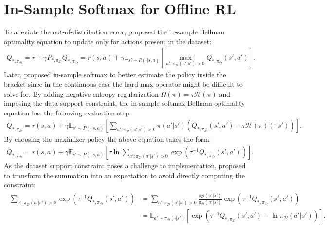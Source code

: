 \documentclass{article}
\newcommand{\AdaBracket}[1]{\left(#1\right)}
\newcommand{\AdaRectBracket}[1]{\left[#1\right]}
\newcommand{\expectation}[2]{\mathbb{E}_{#1}\AdaRectBracket{#2}}
\newcommand{\entropy}{\mathcal{H}\left( \pi \right)}
\newcommand{\datasetOptimalQ}{Q_{*, \pi_{\mathcal{D}}}}
\newcommand{\datasetPolicy}{\pi_{\mathcal{D}}}
\begin{document}
\section{In-Sample Softmax for Offline RL}


To alleviate the out-of-distribution error, \citet{Fujimoto2019-InSampleMax} proposed the in-sample Bellman optimality equation to update only for actions present in the dataset:
\begin{align}
    \datasetOptimalQ = r + \gamma P_{*, \datasetPolicy} \datasetOptimalQ = r(s,a) + \gamma \expectation{s'\sim P(\cdot | s,a)}{\max_{a': \datasetPolicy(a'|s') > 0} \datasetOptimalQ(s',a')}.
    \label{eq:hardmax_offline}
\end{align}
Later, \citet{Xiao2023-InSampleSoftmax} proposed in-sample softmax to better estimate the policy inside the bracket since in the continuous case the hard max operator might be difficult to solve for.
By adding negative entropy regularization $\Omega(\pi) = \tau \entropy$ and imposing the data support constraint, the in-sample softmax Bellman optimality equation has the following evaluation step:
\begin{align}
    \datasetOptimalQ = r(s,a) +  \gamma \expectation{s'\sim P(\cdot | s,a)}{ \sum_{a': \datasetPolicy(a'|s') > 0} \!\!\!\!\! \pi(a'|s') \AdaBracket{\datasetOptimalQ(s',a') - \tau\entropy(\cdot|s')}}.
    \label{eq:insample_softmax}
\end{align}
By choosing the maximizer policy the above equation takes the form:
\begin{align}
    \datasetOptimalQ = r(s,a) +  \gamma \expectation{s'\sim P(\cdot | s,a)}{\tau \ln \!\!\!\!\!\sum_{a': \datasetPolicy(a'|s') > 0} \!\!\!\!\! \exp\AdaBracket{\tau^{-1} \datasetOptimalQ(s',a')}}.
\end{align}
As the dataset support constraint poses a challenge to implementation, \citet{Xiao2023-InSampleSoftmax} proposed to transform the summation into an expectation to avoid directly computing the constraint: 
\begin{align}
    \begin{split}
    \sum_{a': \datasetPolicy(a'|s') > 0} \!\!\!\!\!\!\exp\AdaBracket{\tau^{-1}\datasetOptimalQ (s',a')} &= \!\!\!\!\!\!\sum_{a': \datasetPolicy(a'|s') > 0} \frac{\datasetPolicy(a'|s')}{\datasetPolicy(a'|s')} \exp\AdaBracket{\tau^{-1}\datasetOptimalQ (s',a')} \\
    &= \expectation{a'\sim\datasetPolicy(\cdot | s')}{\exp\AdaBracket{\tau^{-1}\datasetOptimalQ (s',a') - \ln\datasetPolicy(a'|s')}}.
    \end{split}
\end{align}
\end{document}

